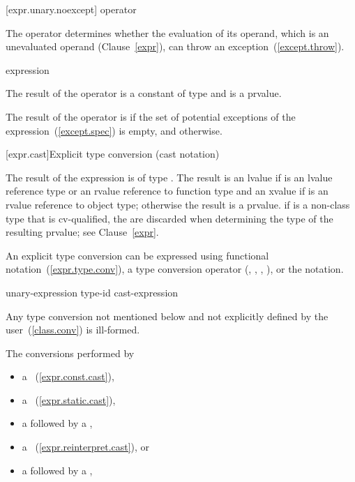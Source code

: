 [expr.unary.noexcept]{ operator}

\pnum
{}%
The  operator determines whether the evaluation of its operand,
which is an unevaluated operand (Clause~\ref{expr}), can throw an
exception~(\ref{except.throw}).

\begin{bnf}
\br
   \terminal{(} expression \terminal{)}
\end{bnf}

\pnum
The result of the  operator is a constant of type 
and is a prvalue.

\pnum
The result of the  operator is  if
the set of potential exceptions of the expression~(\ref{except.spec})
is empty, and  otherwise.%

[expr.cast]{Explicit type conversion (cast notation)}%

\pnum
The result of the expression   is
of type . The result is an lvalue if  is an lvalue
reference type or an rvalue reference to function type and an xvalue if 
is an rvalue reference to object type; otherwise the result is a prvalue.
\enternote 
if  is a non-class type that is cv-qualified, the
 are discarded when determining the type of the
resulting prvalue; see Clause~\ref{expr}.
\exitnote 

\pnum
An explicit type conversion can be expressed using functional
notation~(\ref{expr.type.conv}), a type conversion operator
(, , ,
), or the  notation.

\begin{bnf}
\br
    unary-expression\br
    \terminal{(} type-id \terminal{)} cast-expression
\end{bnf}

\pnum
Any type conversion not mentioned below and not explicitly defined by
the user~(\ref{class.conv}) is ill-formed.

\pnum
The conversions performed by

\begin{itemize}
%
%
%
\item a ~(\ref{expr.const.cast}),
\item a ~(\ref{expr.static.cast}),
\item a  followed by a ,
\item a ~(\ref{expr.reinterpret.cast}), or
\item a  followed by a ,
\end{itemize}

